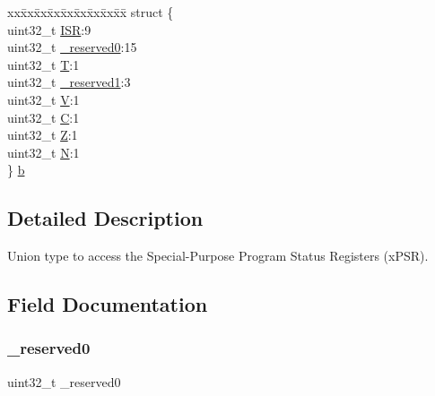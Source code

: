 \begin{DoxyCompactItemize}
\begin{tabbing}
\end{tabbing}\item 
\begin{tabbing}
xx\=xx\=xx\=xx\=xx\=xx\=xx\=xx\=xx\=\kill
struct \{\\
\>uint32\_t \mbox{\hyperlink{unionx_p_s_r___type_ad502ba7dbb2aab5f87c782b28f02622d}{ISR}}:9\\
\>uint32\_t \mbox{\hyperlink{unionx_p_s_r___type_ac8a6a13838a897c8d0b8bc991bbaf7c1}{\_reserved0}}:15\\
\>uint32\_t \mbox{\hyperlink{unionx_p_s_r___type_a6e1cf12e53a20224f6f62c001d9be972}{T}}:1\\
\>uint32\_t \mbox{\hyperlink{unionx_p_s_r___type_a959a73d8faee56599b7e792a7c5a2d16}{\_reserved1}}:3\\
\>uint32\_t \mbox{\hyperlink{unionx_p_s_r___type_acd4a2b64faee91e4a9eef300667fa222}{V}}:1\\
\>uint32\_t \mbox{\hyperlink{unionx_p_s_r___type_a7a1caf92f32fe9ebd8d1fe89b06c7776}{C}}:1\\
\>uint32\_t \mbox{\hyperlink{unionx_p_s_r___type_a5ae954cbd9986cd64625d7fa00943c8e}{Z}}:1\\
\>uint32\_t \mbox{\hyperlink{unionx_p_s_r___type_abae0610bc2a97bbf7f689e953e0b451f}{N}}:1\\
\} \mbox{\hyperlink{unionx_p_s_r___type_a0a25c7b74ccf308a5b9c998204464bec}{b}}\\

\end{tabbing}\end{DoxyCompactItemize}


\subsection{Detailed Description}
Union type to access the Special-\/\+Purpose Program Status Registers (x\+P\+SR). 

\subsection{Field Documentation}
\mbox{\label{unionx_p_s_r___type_ac8a6a13838a897c8d0b8bc991bbaf7c1}} 
\subsubsection{\texorpdfstring{\_reserved0}{\_reserved0}}
{\footnotesize\ttfamily uint32\+\_\+t \+\_\+reserved0}

